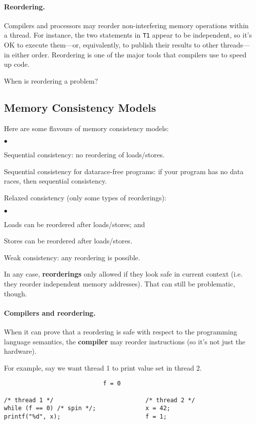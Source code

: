 \documentclass[11pt]{article}
\newcommand{\squishlist}{
 \begin{list}{$\bullet$}
  { \setlength{\itemsep}{0pt}
     \setlength{\parsep}{3pt}
     \setlength{\topsep}{3pt}
     \setlength{\partopsep}{0pt}
     \setlength{\leftmargin}{1.5em}
     \setlength{\labelwidth}{1em}
     \setlength{\labelsep}{0.5em} } }
\newcommand{\squishend}{
  \end{list}  }
\begin{document}
\paragraph{Reordering.} Compilers and processors may reorder 
non-interfering memory operations within a thread. For instance, the
two statements in {\tt T1} appear to be independent, so it's OK to
execute them---or, equivalently, to publish their results to other
threads---in either order. Reordering is one of the major tools that
compilers use to speed up code.

{\sf When is reordering a problem?}\\[2em]

\subsection*{Memory Consistency Models}

Here are some flavours of memory consistency models:

\squishlist
\item Sequential consistency: no reordering of loads/stores.
\item Sequential consistency for datarace-free programs: if your program
  has no data races, then sequential consistency.
\item Relaxed consistency (only some types of reorderings):
\squishlist
        \item Loads can be reordered after loads/stores; and
        \item Stores can be reordered after loads/stores.
\squishend
\item     Weak consistency: any reordering is possible.
\squishend

In any case, {\bf reorderings} only allowed if they look safe in
current context (i.e. they reorder independent memory addresses).
That can still be problematic, though.

\paragraph{Compilers and reordering.}
When it can prove that a reordering is safe with respect to the
programming language semantics, the {\bf compiler} may reorder instructions (so it's not just the hardware).

For example, say we want thread 1 to print value set in thread 2.
  \begin{lstlisting}
                            f = 0

/* thread 1 */                          /* thread 2 */
while (f == 0) /* spin */;              x = 42;
printf("%d", x);                        f = 1;
  \end{lstlisting}
\end{document}
